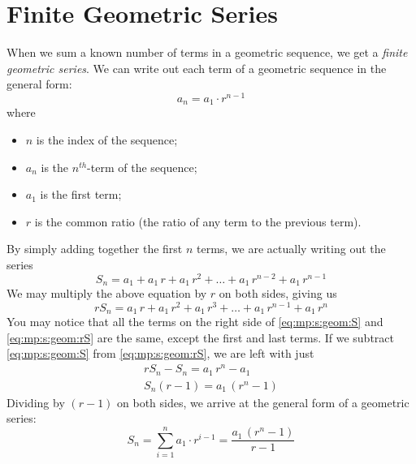 \section{Finite Geometric Series}
When we sum a known number of terms in a geometric sequence, we get a \textit{finite geometric series}. %
We can write out each term of a geometric sequence in the general form:
\begin{equation}
a_n = a_1 \cdot r^{n-1}
\end{equation}
where
\begin{itemize}
\item $n$ is the index of the sequence;
\item $a_n$ is the $n^{th}$-term of the sequence;
\item $a_1$ is the first term;
\item $r$ is the common ratio (the ratio of any term to the previous term).
\end{itemize}

\vspace{12pt}
By simply adding together the first $n$ terms, we are actually writing out the series
\begin{equation}
\label{eq:mp:s:geom:S}
S_n = a_1 + a_1\,r + a_1\,r^2 + \ldots + a_1\,r^{n-2} + a_1\,r^{n-1}
\end{equation}
We may multiply the above equation by $r$ on both sides, giving us
\begin{equation}
\label{eq:mp:s:geom:rS}
rS_n = a_1\,r + a_1\,r^2 + a_1\,r^3 + \ldots + a_1\,r^{n-1} + a_1\,r^n
\end{equation}
You may notice that all the terms on the right side of \eqref{eq:mp:s:geom:S} and \eqref{eq:mp:s:geom:rS} are the same, except the first and last terms. If we subtract \eqref{eq:mp:s:geom:S} from \eqref{eq:mp:s:geom:rS}, we are left with just
\begin{eqnarray*}
\label{eq:mp:s:geom:proof}
rS_n - S_n = a_1\,r^n - a_1 \\
S_n(r - 1) = a_1\,(r^n - 1)
\end{eqnarray*}
Dividing by $(r-1)$ on both sides, we arrive at the general form of a geometric series:
\begin{equation}
\label{eq:mp:se:fg:4}
\boxed{S_n = \sum_{i=1}^n a_1 \cdot r^{i-1} = \frac{a_1 \, (r^n - 1)}{r-1}}
\end{equation}

